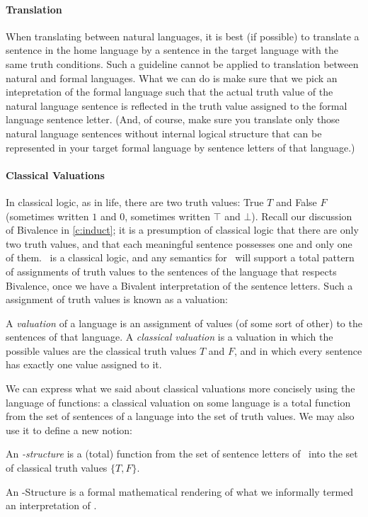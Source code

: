 \paragraph{Translation} When translating between natural languages, it is best (if possible) to translate a sentence in the home language by a sentence in the target language with the same truth conditions. Such a guideline cannot be applied to translation between natural and formal languages. What we can do is make sure that we pick an intepretation of the formal language such that the actual truth value of the natural language sentence is reflected in the truth value assigned to the formal language sentence letter. (And, of course, make sure you translate only those natural language sentences without internal logical structure that can be represented in your target formal language by sentence letters of that language.) 

\paragraph{Classical Valuations} In classical logic, as in life, there are two truth values: True $T$ and False $F$ (sometimes written $1$ and $0$, sometimes written $\top$ and $\bot$). Recall our discussion of Bivalence in \autoref{c:induct}; it is a presumption of classical logic that there are only two truth values, and that each meaningful sentence possesses one and only one of them. \lone\ is a classical logic, and any semantics for \lone\ will support a total pattern of assignments of truth values to the sentences of the language that respects Bivalence, once we have a Bivalent interpretation of the sentence letters. Such a assignment of truth values is known as a valuation:
\begin{definition}[Valuation]
	A \emph{valuation} of a language is an assignment of values (of some sort of other) to the sentences of that language. A \emph{classical valuation} is a valuation in which the possible values are the classical truth values $T$ and $F$, and in which every sentence has exactly one value assigned to it.
\end{definition}
We can express what we said about classical valuations more concisely using the language of functions: a classical valuation on some language is a total function from the set of sentences of a language into the set of truth values. We may also use it to define a new notion: 
	\begin{definition}
		An \emph{\lone-structure} is a (total) function from the set of sentence letters of \lone\ into the set of classical truth values $\{T,F\}$.
	\end{definition} An \lone-Structure is a formal mathematical rendering of what we informally termed an interpretation of \lone.

